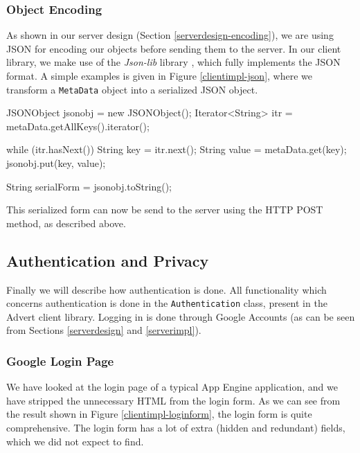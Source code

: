 \subsubsection{Object Encoding}
\label{clientimpl-encoding}
As shown in our server design (Section \ref{serverdesign-encoding}), we are using
JSON for encoding our objects before sending them to the server. In our client
library, we make use of the \emph{Json-lib} library \cite{json-lib-www}, which
fully implements the JSON format. A simple examples is given in Figure
\ref{clientimpl-json}, where we transform a \texttt{MetaData} object into a
serialized JSON object.

\begin{figure*}[ht] %
\begin{center}
\begin{code}
JSONObject    jsonobj = new JSONObject();
Iterator<String> itr  = metaData.getAllKeys().iterator();

while (itr.hasNext()) {
	String key   = itr.next();
	String value = metaData.get(key);
	jsonobj.put(key, value);
}

String serialForm = jsonobj.toString();
\end{code}
\caption{JSON Encoding in Java.\label{clientimpl-json}}
\end{center}
\end{figure*}

This serialized form can now be send to the server using the HTTP POST method,
as described above.

\subsection{Authentication and Privacy}
\label{clientimpl-auth}
Finally we will describe how authentication is done. All functionality which
concerns authentication is done in the \texttt{Authentication} class, present
in the Advert client library. Logging in is done through Google Accounts (as
can be seen from Sections \ref{serverdesign} and \ref{serverimpl}).

\subsubsection{Google Login Page}
We have looked at the login page of a typical App Engine application, and we
have stripped the unnecessary HTML from the login form. As we can see from the
result shown in Figure \ref{clientimpl-loginform}, the login form is quite
comprehensive. The login form has a lot of extra (hidden and redundant) fields,
which we did not expect to find.

